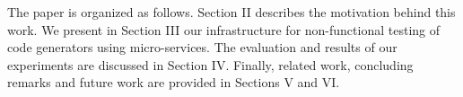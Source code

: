 The paper is organized as follows.
Section II describes the motivation behind this work. We present in Section III our infrastructure for non-functional testing of code generators using micro-services. 
The evaluation and results of our experiments are discussed in Section IV. 
Finally, related work, concluding remarks and future work are provided in Sections V and VI.














